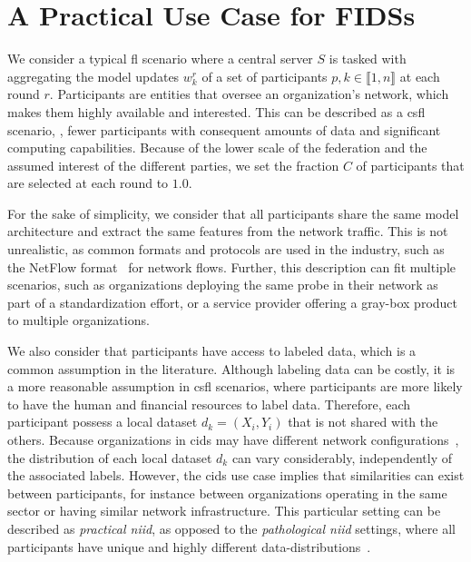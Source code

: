 \section{A Practical Use Case for FIDSs\label{sec:app.overview}}

We consider a typical \gls{fl} scenario where a central server $S$ is tasked with aggregating the model updates $w_k^r$ of a set of participants $p, k\in \llbracket 1,n \rrbracket$ at each round $r$.
Participants are entities that oversee an organization's network, which makes them highly available and interested.
This can be described as a \gls{csfl} scenario, \ie, fewer participants with consequent amounts of data and significant computing capabilities.
Because of the lower scale of the federation and the assumed interest of the different parties, we set the fraction $C$ of participants that are selected at each round to $1.0$.

For the sake of simplicity, we consider that all participants share the same model architecture and extract the same features from the network traffic.
This is not unrealistic, as common formats and protocols are used in the industry, such as the NetFlow format~\cite{rfc3954} for network flows.
Further, this description can fit multiple scenarios, such as organizations deploying the same probe in their network as part of a standardization effort, or a service provider offering a gray-box product to multiple organizations.

We also consider that participants have access to labeled data, which is a common assumption in the literature.
Although labeling data can be costly, it is a more reasonable assumption in \gls{csfl} scenarios, where participants are more likely to have the human and financial resources to label data.
Therefore, each participant possess a local dataset $d_k = (X_i, Y_i)$ that is not shared with the others.
Because organizations in \gls{cids} may have different network configurations~\cite{zhou_surveycoordinatedattacks_2010}, the distribution of each local dataset $d_k$ can vary considerably, independently of the associated labels.
However, the \gls{cids} use case implies that similarities can exist between participants, for instance between organizations operating in the same sector or having similar network infrastructure.
This particular setting can be described as \emph{practical \gls{niid}}, as opposed to the \emph{pathological \gls{niid}} settings, where all participants have unique and highly different data-distributions~\cite{huang_PersonalizedCrossSiloFederated_2021}.